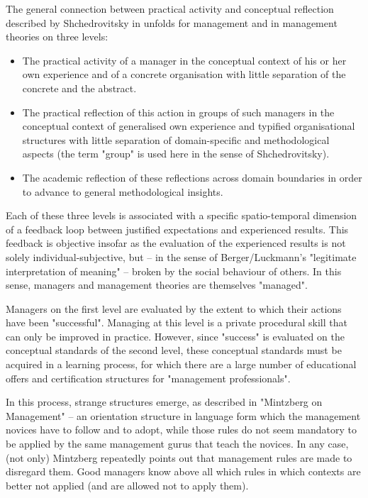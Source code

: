 \documentclass[11pt,a4paper]{article}
\begin{document}
The general connection between practical activity and conceptual reflection
described by Shchedrovitsky in \cite[p. 70 cont.]{MSM} unfolds for management
and in management theories on three levels:
\begin{itemize}
\item The practical activity of a manager in the conceptual context of his or
  her own experience and of a concrete organisation with little separation of
  the concrete and the abstract.
\item The practical reflection of this action in groups of such managers in
  the conceptual context of generalised own experience and typified
  organisational structures with little separation of domain-specific and
  methodological aspects (the term "group" is used here in the sense of
  Shchedrovitsky).
\item The academic reflection of these reflections across domain boundaries in
  order to advance to general methodological insights.
\end{itemize}
Each of these three levels is associated with a specific spatio-temporal
dimension of a feedback loop between justified expectations and experienced
results. This feedback is objective insofar as the evaluation of the
experienced results is not solely individual-subjective, but -- in the sense
of Berger/Luckmann's "legitimate interpretation of meaning" \cite{Berger1966}
-- broken by the social behaviour of others. In this sense, managers and
management theories are themselves "managed".

Managers on the first level are evaluated by the extent to which their actions
have been "successful". Managing at this level is a private procedural skill
that can only be improved in practice. However, since "success" is evaluated
on the conceptual standards of the second level, these conceptual standards
must be acquired in a learning process, for which there are a large number of
educational offers and certification structures for "management
professionals".

In this process, strange structures emerge, as described in "Mintzberg on
Management" -- an orientation structure in language form which the management
novices have to follow and to adopt, while those rules do not seem mandatory
to be applied by the same management gurus that teach the novices. In any
case, (not only) Mintzberg repeatedly points out that management rules are
made to disregard them. Good managers know above all which rules in which
contexts are better not applied (and are allowed not to apply them).
\end{document}
